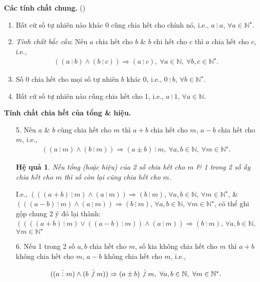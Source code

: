 \documentclass{article}
\numberwithin{equation}{section}
\newtheorem{hequa}{Hệ quả}[section]
\begin{document}
\noindent\textbf{Các tính chất chung.} (\cite[\S3, p. 15]{Binh_Toan_6_tap_1})
\begin{enumerate}
	\item Bất cứ số tự nhiên nào khác 0 cũng chia hết cho chính nó, i.e., $a\ \vdots\ a$, $\forall a\in\mathbb{N}^\star$.
	\item \textit{Tính chất bắc cầu}: Nếu $a$ chia hết cho $b$ \& $b$ chi hết cho $c$ thì $a$ chia hết cho $c$, i.e.,
	\begin{align*}
		((a\ \vdots\ b)\land(b\ \vdots\ c))\Rightarrow(a\ \vdots\ c),\ \forall a\in\mathbb{N},\ \forall b,c\in\mathbb{N}^\star.
	\end{align*}
	\item Số 0 chia hết cho mọi số tự nhiên $b$ khác 0, i.e., $0\ \vdots\ b$, $\forall b\in\mathbb{N}^\star$.
	\item Bất cứ số tự nhiên nào cũng chia hết cho 1, i.e., $a\ \vdots\ 1$, $\forall a\in\mathbb{N}$.
\end{enumerate}
\noindent\textbf{Tính chất chia hết của tổng \& hiệu.}
\begin{enumerate}
	\item[5.] Nếu $a$ \& $b$ cùng chia hết cho $m$ thì $a + b$ chia hết cho $m$, $a - b$ chia hết cho $m$, i.e.,
	\begin{align*}
		((a\ \vdots\ m)\land(b\ \vdots\ m))\Rightarrow(a\pm b)\ \vdots\ m,\ \forall a,b\in\mathbb{N},\ \forall m\in\mathbb{N}^\star.
	\end{align*}
	
	\begin{hequa}
		Nếu tổng (hoặc hiệu) của 2 số chia hết cho $m$ \& 1 trong 2 số ấy chia hết cho $m$ thì số còn lại cũng chia hết cho $m$.
	\end{hequa}
	I.e., $(((a + b)\ \vdots\ m)\land(a\ \vdots\ m))\Rightarrow(b\ \vdots\ m)$, $\forall a,b\in\mathbb{N}$, $\forall m\in\mathbb{N}^\star$, \& $(((a - b)\ \vdots\ m)\land(a\ \vdots\ m))\Rightarrow(b\ \vdots\ m)$, $\forall a,b\in\mathbb{N}$, $\forall m\in\mathbb{N}^\star$, có thể ghi gộp chung 2 ý đó lại thành: $((((a + b)\ \vdots\ m)\lor((a - b)\ \vdots\ m))\land(a\ \vdots\ m))\Rightarrow(b\ \vdots\ m)$, $\forall a,b\in\mathbb{N}$, $\forall m\in\mathbb{N}^\star$
	\item[6.] Nếu 1 trong 2 số $a,b$ chia hết cho $m$, số kia không chia hết cho $m$ thì $a + b$ không chia hết cho $m$, $a - b$ không chia hết cho $m$, i.e.,
	\begin{align*}
		((a\ \vdots\ m)\land(b\not\vdots\ m))\Rightarrow(a\pm b)\not\vdots\ m,\ \forall a,b\in\mathbb{N},\ \forall m\in\mathbb{N}^\star.
	\end{align*}
\end{enumerate}
\end{document}

